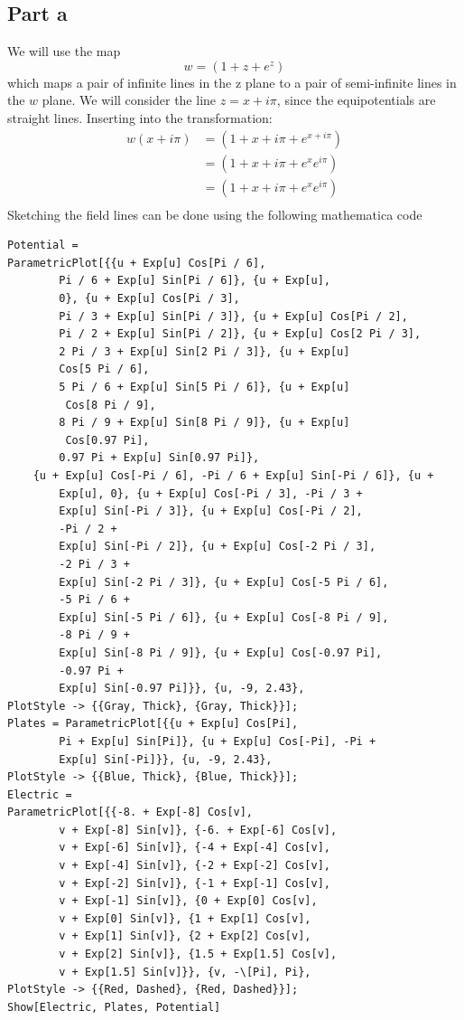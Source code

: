 \documentclass[a4paper,12pt]{article}
\begin{document}
\subsection*{Part a}
We will use the map 
\begin{equation}
w=(1+z+e^z)
\end{equation}
which maps a pair of infinite lines in the z plane to a pair of semi-infinite lines in the $w$ plane. We will consider the line  $z=x+i\pi$, since the equipotentials are straight lines. Inserting into the transformation:
\begin{equation}
\begin{aligned}
	w(x+i\pi)&=(1+x+i\pi+e^{x+i\pi})\\
	&=(1+x+i\pi+e^{x}e^{i\pi})\\
	&=(1+x+i\pi+e^{x}e^{i\pi})\\
\end{aligned}
\end{equation}
Sketching the field lines can be done using the following mathematica code
\begin{lstlisting}
Potential = 
ParametricPlot[{{u + Exp[u] Cos[Pi / 6], 
		Pi / 6 + Exp[u] Sin[Pi / 6]}, {u + Exp[u], 
		0}, {u + Exp[u] Cos[Pi / 3], 
		Pi / 3 + Exp[u] Sin[Pi / 3]}, {u + Exp[u] Cos[Pi / 2], 
		Pi / 2 + Exp[u] Sin[Pi / 2]}, {u + Exp[u] Cos[2 Pi / 3], 
		2 Pi / 3 + Exp[u] Sin[2 Pi / 3]}, {u + Exp[u] 
		Cos[5 Pi / 6], 
		5 Pi / 6 + Exp[u] Sin[5 Pi / 6]}, {u + Exp[u]
		 Cos[8 Pi / 9], 
		8 Pi / 9 + Exp[u] Sin[8 Pi / 9]}, {u + Exp[u]
		 Cos[0.97 Pi], 
		0.97 Pi + Exp[u] Sin[0.97 Pi]},
	{u + Exp[u] Cos[-Pi / 6], -Pi / 6 + Exp[u] Sin[-Pi / 6]}, {u + 
		Exp[u], 0}, {u + Exp[u] Cos[-Pi / 3], -Pi / 3 + 
		Exp[u] Sin[-Pi / 3]}, {u + Exp[u] Cos[-Pi / 2],
		-Pi / 2 + 
		Exp[u] Sin[-Pi / 2]}, {u + Exp[u] Cos[-2 Pi / 3], 
		-2 Pi / 3 + 
		Exp[u] Sin[-2 Pi / 3]}, {u + Exp[u] Cos[-5 Pi / 6], 
		-5 Pi / 6 + 
		Exp[u] Sin[-5 Pi / 6]}, {u + Exp[u] Cos[-8 Pi / 9], 
		-8 Pi / 9 + 
		Exp[u] Sin[-8 Pi / 9]}, {u + Exp[u] Cos[-0.97 Pi], 
		-0.97 Pi + 
		Exp[u] Sin[-0.97 Pi]}}, {u, -9, 2.43}, 
PlotStyle -> {{Gray, Thick}, {Gray, Thick}}];
Plates = ParametricPlot[{{u + Exp[u] Cos[Pi], 
		Pi + Exp[u] Sin[Pi]}, {u + Exp[u] Cos[-Pi], -Pi + 
		Exp[u] Sin[-Pi]}}, {u, -9, 2.43}, 
PlotStyle -> {{Blue, Thick}, {Blue, Thick}}];
Electric = 
ParametricPlot[{{-8. + Exp[-8] Cos[v], 
		v + Exp[-8] Sin[v]}, {-6. + Exp[-6] Cos[v], 
		v + Exp[-6] Sin[v]}, {-4 + Exp[-4] Cos[v], 
		v + Exp[-4] Sin[v]}, {-2 + Exp[-2] Cos[v], 
		v + Exp[-2] Sin[v]}, {-1 + Exp[-1] Cos[v], 
		v + Exp[-1] Sin[v]}, {0 + Exp[0] Cos[v], 
		v + Exp[0] Sin[v]}, {1 + Exp[1] Cos[v], 
		v + Exp[1] Sin[v]}, {2 + Exp[2] Cos[v], 
		v + Exp[2] Sin[v]}, {1.5 + Exp[1.5] Cos[v], 
		v + Exp[1.5] Sin[v]}}, {v, -\[Pi], Pi}, 
PlotStyle -> {{Red, Dashed}, {Red, Dashed}}];
Show[Electric, Plates, Potential]
\end{lstlisting}
\end{document}
